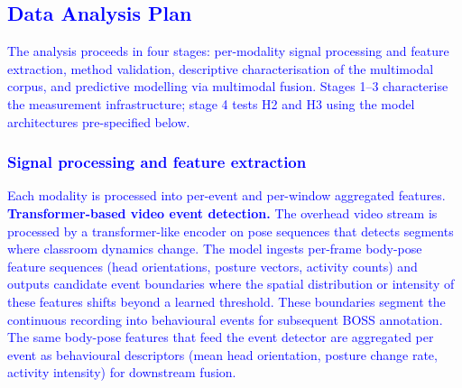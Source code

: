 \textcolor{blue}{\subsection{Data Analysis Plan}\label{subsec:analysis-plan}}

\textcolor{blue}{The analysis proceeds in four stages: per-modality signal processing and feature extraction, method validation, descriptive characterisation of the multimodal corpus, and predictive modelling via multimodal fusion. Stages 1--3 characterise the measurement infrastructure; stage 4 tests H2 and H3 using the model architectures pre-specified below.}

\textcolor{blue}{\subsubsection{Signal processing and feature extraction}}

\textcolor{blue}{Each modality is processed into per-event and per-window aggregated features. \textbf{Transformer-based video event detection.} The overhead video stream is processed by a transformer-like encoder on pose sequences that detects segments where classroom dynamics change. The model ingests per-frame body-pose feature sequences (head orientations, posture vectors, activity counts) and outputs candidate event boundaries where the spatial distribution or intensity of these features shifts beyond a learned threshold. These boundaries segment the continuous recording into behavioural events for subsequent BOSS annotation. The same body-pose features that feed the event detector are aggregated per event as behavioural descriptors (mean head orientation, posture change rate, activity intensity) for downstream fusion.}

